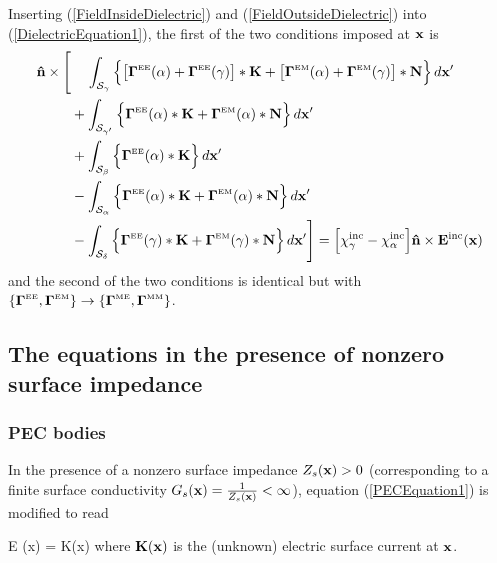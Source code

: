 \documentclass[letterpaper]{article}
\begin{document}
Inserting (\ref{FieldInsideDielectric}) and 
(\ref{FieldOutsideDielectric}) into (\ref{DielectricEquation1}), 
the first of the two conditions imposed at $\mathbf{x}$ is
\begin{align}
\mathbf{\hat n}\times
 \Bigg[  &\hphantom{+}\,\,\int_{\mathcal{S_\gamma}}
           \Big\{ \big[\boldsymbol{\Gamma}^{\hbox{\tiny{EE}}}(\alpha) + \boldsymbol{\Gamma}^{\hbox{\tiny{EE}}}(\gamma)\big]
                   *\mathbf{K} 
                + \big[\boldsymbol{\Gamma}^{\hbox{\tiny{EM}}}(\alpha) + \boldsymbol{\Gamma}^{\hbox{\tiny{EM}}}(\gamma)\big]
                   *\mathbf{N} 
           \Big\} \, d\mathbf{x}^\prime
\nonumber \\
         &+\int_{\mathcal{S}_{\gamma^\prime}}
           \Big\{ \boldsymbol{\Gamma}^{\hbox{\tiny{EE}}}(\alpha)*\mathbf{K} 
                 +\boldsymbol{\Gamma}^{\hbox{\tiny{EM}}}(\alpha)*\mathbf{N} 
           \Big\} \, d\mathbf{x}^\prime
\nonumber \\
         &+\int_{\mathcal{S_\beta}} 
           \Big\{ \boldsymbol{\Gamma}^{\hbox{\tiny{EE}}}(\alpha)*\mathbf{K} \Big\} \, d\mathbf{x}^\prime
\nonumber \\
         &-\int_{\mathcal{S_\alpha}}
           \Big\{ \boldsymbol{\Gamma}^{\hbox{\tiny{EE}}}(\alpha)*\mathbf{K} 
                 +\boldsymbol{\Gamma}^{\hbox{\tiny{EM}}}(\alpha)*\mathbf{N} 
           \Big\} \, d\mathbf{x}^\prime
\nonumber \\
         &-\int_{\mathcal{S_\delta}} 
           \Big\{ \boldsymbol{\Gamma}^{\hbox{\tiny{EE}}}(\gamma)*\mathbf{K} 
                 +\boldsymbol{\Gamma}^{\hbox{\tiny{EM}}}(\gamma)*\mathbf{N} 
           \Big\} \, d\mathbf{x}^\prime
 \Bigg]
= \Big[\chi^{\hbox{\scriptsize{inc}}}_\gamma - \chi^{\hbox{\scriptsize{inc}}}_\alpha\Big] 
   \mathbf{\hat n}\times \mathbf{E}^{\hbox{\scriptsize{inc}}}(\mathbf{x})
\label{DielectricEquationBreakdown}
\end{align}
and the second of the two conditions is identical 
but with 
$\{\boldsymbol{\Gamma}^{\hbox{\tiny{EE}}}, \boldsymbol{\Gamma}^{\hbox{\tiny{EM}}}\} \to 
 \{\boldsymbol{\Gamma}^{\hbox{\tiny{ME}}}, \boldsymbol{\Gamma}^{\hbox{\tiny{MM}}}\}$.

\subsection{The equations in the presence of nonzero surface impedance}

\medskip

\subsubsection*{PEC bodies} 

In the presence of a nonzero surface impedance $Z_s(\mathbf{x})>0$
(corresponding to a finite surface conductivity
 $G_s(\mathbf{x}) = \frac{1}{Z_s(\mathbf{x})} < \infty$),
equation (\ref{PECEquation1}) is modified to read 

{ \times \vb E (\vb x) 
  = 
   \times \vb K(\vb x)
}
where $\mathbf{K}(\mathbf{x})$ is the (unknown) electric surface current
at $\mathbf{x}$. 
\end{document}
